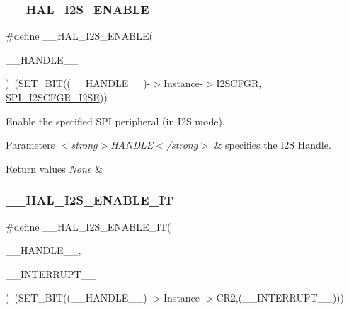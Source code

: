 \subsubsection{\texorpdfstring{\+\_\+\+\_\+\+H\+A\+L\+\_\+\+I2\+S\+\_\+\+E\+N\+A\+B\+LE}{\_\_HAL\_I2S\_ENABLE}}
{\footnotesize\ttfamily \#define \+\_\+\+\_\+\+H\+A\+L\+\_\+\+I2\+S\+\_\+\+E\+N\+A\+B\+LE(\begin{DoxyParamCaption}\item[{}]{\+\_\+\+\_\+\+H\+A\+N\+D\+L\+E\+\_\+\+\_\+ }\end{DoxyParamCaption})~(S\+E\+T\+\_\+\+B\+IT((\+\_\+\+\_\+\+H\+A\+N\+D\+L\+E\+\_\+\+\_\+)-\/$>$Instance-\/$>$I2\+S\+C\+F\+GR, \hyperlink{group___peripheral___registers___bits___definition_ga30d76c7552c91bbd5cbac70d9c56ebb3}{S\+P\+I\+\_\+\+I2\+S\+C\+F\+G\+R\+\_\+\+I2\+SE}))}



Enable the specified S\+PI peripheral (in I2S mode). 


\begin{DoxyParams}{Parameters}
{\em $<$strong$>$\+H\+A\+N\+D\+L\+E$<$/strong$>$} & specifies the I2S Handle. \\
\hline
\end{DoxyParams}

\begin{DoxyRetVals}{Return values}
{\em None} & \\
\hline
\end{DoxyRetVals}
\mbox{\label{group___i2_s___exported__macros_gad6f90125be5ad17065e5378c7580708a}} 
\subsubsection{\texorpdfstring{\+\_\+\+\_\+\+H\+A\+L\+\_\+\+I2\+S\+\_\+\+E\+N\+A\+B\+L\+E\+\_\+\+IT}{\_\_HAL\_I2S\_ENABLE\_IT}}
{\footnotesize\ttfamily \#define \+\_\+\+\_\+\+H\+A\+L\+\_\+\+I2\+S\+\_\+\+E\+N\+A\+B\+L\+E\+\_\+\+IT(\begin{DoxyParamCaption}\item[{}]{\+\_\+\+\_\+\+H\+A\+N\+D\+L\+E\+\_\+\+\_\+,  }\item[{}]{\+\_\+\+\_\+\+I\+N\+T\+E\+R\+R\+U\+P\+T\+\_\+\+\_\+ }\end{DoxyParamCaption})~(S\+E\+T\+\_\+\+B\+IT((\+\_\+\+\_\+\+H\+A\+N\+D\+L\+E\+\_\+\+\_\+)-\/$>$Instance-\/$>$C\+R2,(\+\_\+\+\_\+\+I\+N\+T\+E\+R\+R\+U\+P\+T\+\_\+\+\_\+)))}



